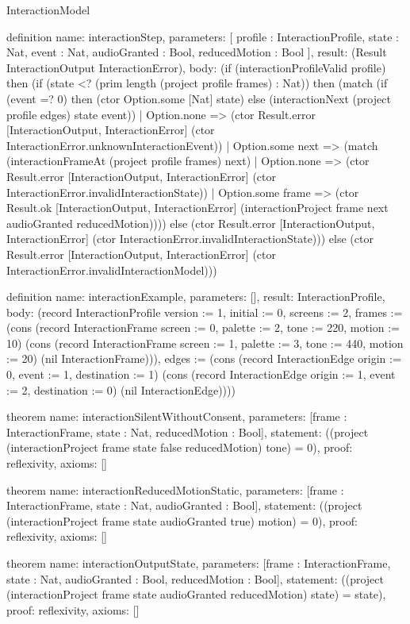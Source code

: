 \begin{lexlean}{InteractionModel}
\begin{semanticmodule}
definition{
  name: interactionStep,
  parameters: [
    profile : InteractionProfile,
    state : Nat,
    event : Nat,
    audioGranted : Bool,
    reducedMotion : Bool
  ],
  result: (Result InteractionOutput InteractionError),
  body: (if (interactionProfileValid profile) then (if (state <? (prim length (project profile frames) : Nat)) then (match (if (event =? 0) then (ctor Option.some [Nat] state) else (interactionNext (project profile edges) state event))
    | Option.none => (ctor Result.error [InteractionOutput, InteractionError] (ctor InteractionError.unknownInteractionEvent))
    | Option.some next => (match (interactionFrameAt (project profile frames) next)
      | Option.none => (ctor Result.error [InteractionOutput, InteractionError] (ctor InteractionError.invalidInteractionState))
      | Option.some frame => (ctor Result.ok [InteractionOutput, InteractionError] (interactionProject frame next audioGranted reducedMotion)))) else (ctor Result.error [InteractionOutput, InteractionError] (ctor InteractionError.invalidInteractionState))) else (ctor Result.error [InteractionOutput, InteractionError] (ctor InteractionError.invalidInteractionModel)))
}

definition{
  name: interactionExample,
  parameters: [],
  result: InteractionProfile,
  body: (record InteractionProfile {version := 1, initial := 0, screens := 2, frames := (cons (record InteractionFrame {screen := 0, palette := 2, tone := 220, motion := 10}) (cons (record InteractionFrame {screen := 1, palette := 3, tone := 440, motion := 20}) (nil InteractionFrame))), edges := (cons (record InteractionEdge {origin := 0, event := 1, destination := 1}) (cons (record InteractionEdge {origin := 1, event := 2, destination := 0}) (nil InteractionEdge)))})
}

theorem{
  name: interactionSilentWithoutConsent,
  parameters: [frame : InteractionFrame, state : Nat, reducedMotion : Bool],
  statement: ((project (interactionProject frame state false reducedMotion) tone) = 0),
  proof: reflexivity{},
  axioms: []
}

theorem{
  name: interactionReducedMotionStatic,
  parameters: [frame : InteractionFrame, state : Nat, audioGranted : Bool],
  statement: ((project (interactionProject frame state audioGranted true) motion) = 0),
  proof: reflexivity{},
  axioms: []
}

theorem{
  name: interactionOutputState,
  parameters: [frame : InteractionFrame, state : Nat, audioGranted : Bool, reducedMotion : Bool],
  statement: ((project (interactionProject frame state audioGranted reducedMotion) state) = state),
  proof: reflexivity{},
  axioms: []
}


\end{semanticmodule}
\end{lexlean}
